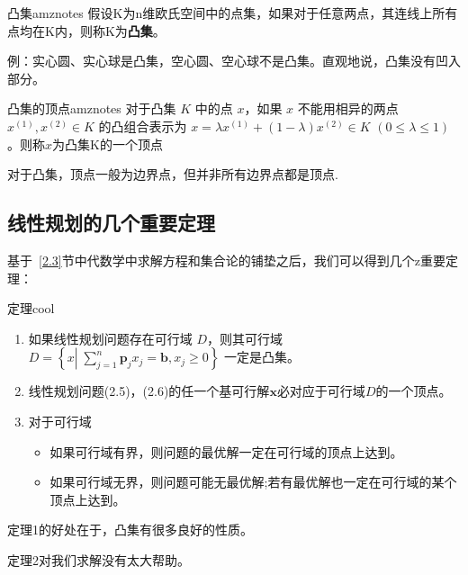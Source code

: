     \begin{dfnbox}{凸集}{amznotes}
        假设K为n维欧氏空间中的点集，如果对于任意两点，其连线上所有点均在K内，则称K为\textbf{凸集}。
    \end{dfnbox}
    例：实心圆、实心球是凸集，空心圆、空心球不是凸集。直观地说，凸集没有凹入部分。
    \begin{dfnbox}{凸集的顶点}{amznotes}
        对于凸集 $K$ 中的点 $x$，如果 $x$ 不能用相异的两点 $x^{(1)}, x^{(2)} \in K$ 的凸组合表示为
$x = \lambda x^{(1)} + (1 - \lambda) x^{(2)} \in K$ \quad $(0 \leq \lambda \leq 1)$。则称$x$为凸集K的一个顶点
    \end{dfnbox}
    对于凸集，顶点一般为边界点，但并非所有边界点都是顶点.
    

    \subsection{线性规划的几个重要定理}
    基于~\ref{2.3}节中代数学中求解方程和集合论的铺垫之后，我们可以得到几个z重要定理：
    \begin{thmbox}{定理}{cool}
        \begin{enumerate}
            \item 如果线性规划问题存在可行域 $D$，则其可行域 $D = \left\{ x \left| \; \sum_{j=1}^n \mathbf{p}_j x_j = \mathbf{b}, x_j \geq 0 \right. \right\}$ 一定是凸集。
            \item 线性规划问题(2.5)，(2.6)的任一个基可行解$\mathbf{x}$必对应于可行域$D$的一个顶点。
            \item 对于可行域
            \begin{itemize}
                \item 如果可行域有界，则问题的最优解一定在可行域的顶点上达到。
                \item 如果可行域无界，则问题可能无最优解;若有最优解也一定在可行域的某个顶点上达到。
            \end{itemize}
        \end{enumerate}
    \end{thmbox}
        定理1的好处在于，凸集有很多良好的性质。

        定理2对我们求解没有太大帮助。

